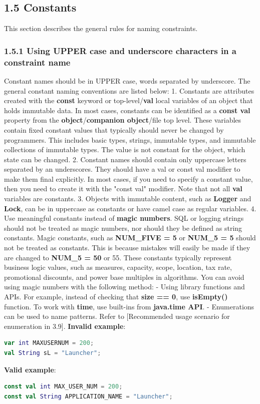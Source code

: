 \subsection*{\textbf{1.5 Constants}}
\label{sec:1.5}
This section describes the general rules for naming constraints.
\subsubsection*{\textbf{1.5.1 Using UPPER case and underscore characters in a constraint name}}
\leavevmode\newline
\label{sec:1.5.1}
Constant names should be in UPPER case, words separated by underscore. The general constant naming conventions are listed below:
1. Constants are attributes created with the \textbf{const} keyword or top-level/\textbf{val} local variables of an object that holds immutable data. In most cases, constants can be identified as a \textbf{const val} property from the \textbf{object}/\textbf{companion object}/file top level. These variables contain fixed constant values that typically should never be changed by programmers. This includes basic types, strings, immutable types, and immutable collections of immutable types. The value is not constant for the object, which state can be changed.
2. Constant names should contain only uppercase letters separated by an underscores. They should have a val or const val modifier to make them final explicitly. In most cases, if you need to specify a constant value, then you need to create it with the "const val" modifier. Note that not all \textbf{val} variables are constants.
3. Objects with immutable content, such as \textbf{Logger} and \textbf{Lock}, can be in uppercase as constants or have camel case as regular variables.
4. Use meaningful constants instead of \textbf{magic numbers}. SQL or logging strings should not be treated as magic numbers, nor should they be defined as string constants.
Magic constants, such as \textbf{NUM\_FIVE = 5} or \textbf{NUM\_5 = 5} should not be treated as constants. This is because mistakes will easily be made if they are changed to \textbf{NUM\_5 = 50} or 55.
These constants typically represent business logic values, such as measures, capacity, scope, location, tax rate, promotional discounts, and power base multiples in algorithms.
You can avoid using magic numbers with the following method:
- Using library functions and APIs. For example, instead of checking that \textbf{size == 0}, use \textbf{isEmpty()} function. To work with \textbf{time}, use built-ins from \textbf{java.time API}.
- Enumerations can be used to name patterns. Refer to [Recommended usage scenario for enumeration in 3.9].
\textbf{Invalid example}:
\begin{lstlisting}[language=Kotlin]
var int MAXUSERNUM = 200;
val String sL = "Launcher";
\end{lstlisting}
\textbf{Valid example}:
\begin{lstlisting}[language=Kotlin]
const val int MAX_USER_NUM = 200;
const val String APPLICATION_NAME = "Launcher";
\end{lstlisting}
